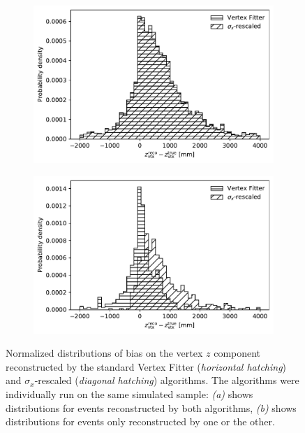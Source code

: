 \begin{figure}[t]
	\centering
	\begin{subfigure}{.45\textwidth}
		\includegraphics[width=\textwidth]{graphics/03-vertex_reconstruction/VF_vs_2DX_Lambda_endvertex_z_bias_common.pdf}
		\caption{}
		\label{fig:3:3D_vs_2D_lambda_endvertex_bias_common}
	\end{subfigure}
	\begin{subfigure}{.45\textwidth}
		\includegraphics[width=\textwidth]{graphics/03-vertex_reconstruction/VF_vs_2DX_Lambda_endvertex_z_bias_exclusive.pdf}
		\caption{}
		\label{fig:3:3D_vs_2D_lambda_endvertex_bias_exclusive}
	\end{subfigure}
	\caption{Normalized distributions of bias on the \lambdadecay vertex $z$ component reconstructed by the standard Vertex Fitter (\textit{horizontal hatching}) and $\sigma_x$-rescaled (\textit{diagonal hatching}) algorithms. The algorithms were individually run on the same simulated \demonstratorshort sample: \textit{(a)} shows distributions for events reconstructed by both algorithms, \textit{(b)} shows distributions for events only reconstructed by one or the other.}
	\label{fig:3:3D_vs_2D_lambda_endvertex_bias_common_vs_exclusive}
\end{figure}

